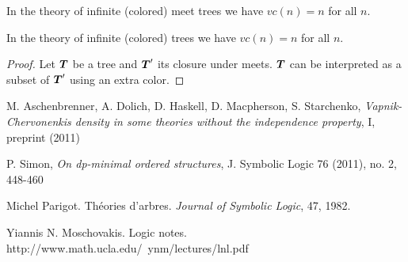 \documentclass{amsart}
\DeclareMathOperator{\TT}{\boldface T}
\begin{document}
	\begin{Corollary}
		In the theory of infinite (colored) meet trees we have $vc(n) = n$ for all $n$.
	\end{Corollary}
	\begin{Corollary}
		In the theory of infinite (colored) trees we have $vc(n) = n$ for all $n$.
	\end{Corollary}
	\begin{proof}
		Let $\TT$ be a tree and $\TT'$ its closure under meets. $\TT$ can be interpreted as a subset of $\TT'$ using an extra color.
	\end{proof}

\begin{thebibliography}{9}

	M. Aschenbrenner, A. Dolich, D. Haskell, D. Macpherson, S. Starchenko,
	\textit{Vapnik-Chervonenkis density in some theories without the independence property}, I, preprint (2011)

	P. Simon,
	\textit{On dp-minimal ordered structures},
	J. Symbolic Logic 76 (2011), no. 2, 448-460

	Michel Parigot.
	Th\'eories d'arbres.
	\textit{Journal of Symbolic Logic}, 47, 1982.
	
	Yiannis N. Moschovakis.
	Logic notes.
	http://www.math.ucla.edu/~ynm/lectures/lnl.pdf
	
\end{thebibliography}
\end{document}
